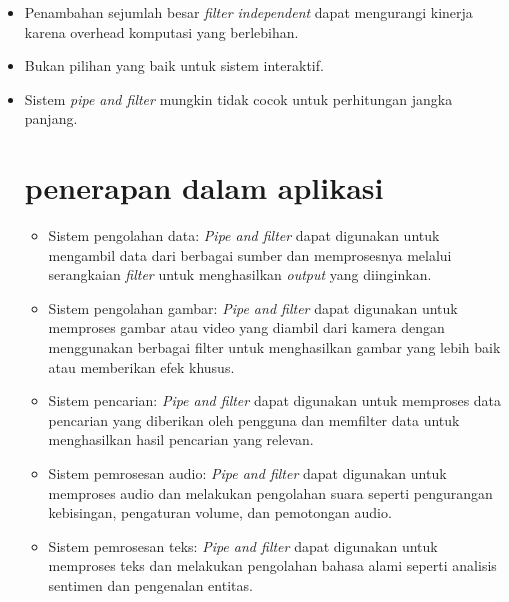 	\begin{itemize}
		\item Penambahan sejumlah besar \textit{filter independent} dapat mengurangi kinerja karena overhead komputasi yang berlebihan.
		\item Bukan pilihan yang baik untuk sistem interaktif.
		\item Sistem \textit{pipe and filter} mungkin tidak cocok untuk perhitungan jangka panjang.
		
	\section{penerapan dalam aplikasi}
		\begin{itemize}
			\item Sistem pengolahan data: \textit{Pipe and filter} dapat digunakan untuk mengambil data dari berbagai sumber dan memprosesnya melalui serangkaian \textit{filter} untuk menghasilkan \textit{output} yang diinginkan.
			
			\item Sistem pengolahan gambar: \textit{Pipe and filter} dapat digunakan untuk memproses gambar atau video yang diambil dari kamera dengan menggunakan berbagai filter untuk menghasilkan gambar yang lebih baik atau memberikan efek khusus.
			
			\item Sistem pencarian: \textit{Pipe and filter} dapat digunakan untuk memproses data pencarian yang diberikan oleh pengguna dan memfilter data untuk menghasilkan hasil pencarian yang relevan.
			
			\item Sistem pemrosesan audio: \textit{Pipe and filter} dapat digunakan untuk memproses audio dan melakukan pengolahan suara seperti pengurangan kebisingan, pengaturan volume, dan pemotongan audio.
			
			\item Sistem pemrosesan teks: \textit{Pipe and filter} dapat digunakan untuk memproses teks dan melakukan pengolahan bahasa alami seperti analisis sentimen dan pengenalan entitas.
		\end{itemize}
	\end{itemize}

